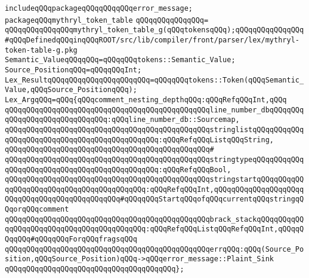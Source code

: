 \newline
\newline
\verb|includeqQQqpackageqQQqqQQqqQQqerror_message;|\newline
\newline
\verb|packageqQQqmythryl_token_table|\newline
\verb|qQQqqQQqqQQqqQQq=|\newline
\verb|qQQqqQQqqQQqqQQqmythryl_token_table_g(qQQqtokensqQQq);qQQqqQQqqQQqqQQq#qQQqDefinedqQQqinqQQqROOT/src/lib/compiler/front/parser/lex/mythryl-token-table-g.pkg|\newline
\newline
\verb|Semantic_ValueqQQqqQQq=qQQqqQQqtokens::Semantic_Value;|\newline
\verb|Source_PositionqQQq=qQQqqQQqInt;|\newline
\verb|Lex_ResultqQQqqQQqqQQqqQQqqQQqqQQq=qQQqqQQqtokens::Token(qQQqSemantic_Value,qQQqSource_PositionqQQq);|\newline
\newline
\verb|Lex_ArgqQQq=qQQq{qQQqcomment_nesting_depthqQQq:qQQqRefqQQqInt,qQQq|\newline
\verb|qQQqqQQqqQQqqQQqqQQqqQQqqQQqqQQqqQQqqQQqqQQqqQQqline_number_dbqQQqqQQqqQQqqQQqqQQqqQQqqQQqqQQq:qQQqline_number_db::Sourcemap,|\newline
\verb|qQQqqQQqqQQqqQQqqQQqqQQqqQQqqQQqqQQqqQQqqQQqqQQqstringlistqQQqqQQqqQQqqQQqqQQqqQQqqQQqqQQqqQQqqQQqqQQqqQQq:qQQqRefqQQqListqQQqString,|\newline
\verb|qQQqqQQqqQQqqQQqqQQqqQQqqQQqqQQqqQQqqQQqqQQqqQQq#|\newline
\verb|qQQqqQQqqQQqqQQqqQQqqQQqqQQqqQQqqQQqqQQqqQQqqQQqstringtypeqQQqqQQqqQQqqQQqqQQqqQQqqQQqqQQqqQQqqQQqqQQqqQQq:qQQqRefqQQqBool,|\newline
\verb|qQQqqQQqqQQqqQQqqQQqqQQqqQQqqQQqqQQqqQQqqQQqqQQqstringstartqQQqqQQqqQQqqQQqqQQqqQQqqQQqqQQqqQQqqQQqqQQq:qQQqRefqQQqInt,qQQqqQQqqQQqqQQqqQQqqQQqqQQqqQQqqQQqqQQqqQQqqQQq#qQQqqQQqStartqQQqofqQQqcurrentqQQqstringqQQqorqQQqcomment|\newline
\verb|qQQqqQQqqQQqqQQqqQQqqQQqqQQqqQQqqQQqqQQqqQQqqQQqbrack_stackqQQqqQQqqQQqqQQqqQQqqQQqqQQqqQQqqQQqqQQqqQQq:qQQqRefqQQqListqQQqRefqQQqInt,qQQqqQQqqQQq#qQQqqQQqForqQQqfragsqQQq|\newline
\newline
\verb|qQQqqQQqqQQqqQQqqQQqqQQqqQQqqQQqqQQqqQQqqQQqqQQqerrqQQq:qQQq(Source_Position,qQQqSource_Position)qQQq->qQQqerror_message::Plaint_Sink|\newline
\verb|qQQqqQQqqQQqqQQqqQQqqQQqqQQqqQQqqQQqqQQq};|\newline
